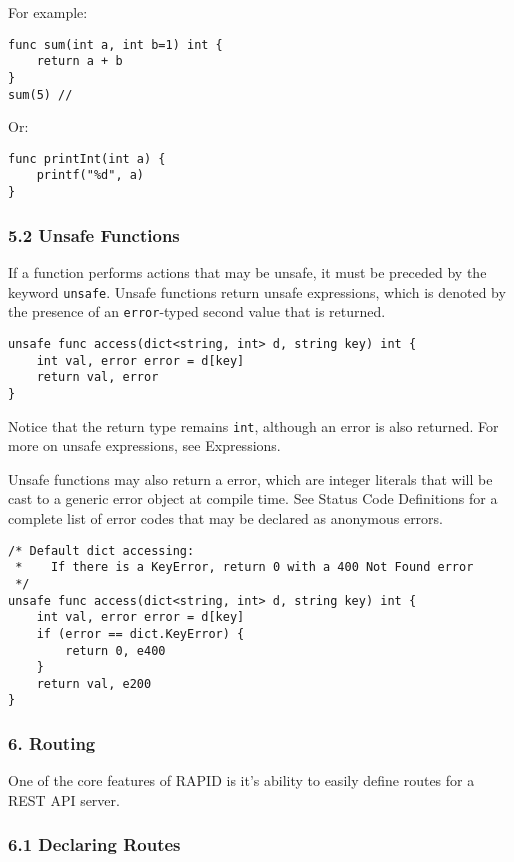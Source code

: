 For example:

\begin{verbatim}
func sum(int a, int b=1) int {
    return a + b
}
sum(5) //
\end{verbatim}

Or:

\begin{verbatim}
func printInt(int a) {
    printf("%d", a)
}
\end{verbatim}

\subsubsection*{5.2 Unsafe Functions}\label{unsafe-functions}

If a function performs actions that may be unsafe, it must be preceded
by the keyword \texttt{unsafe}. Unsafe functions return unsafe
expressions, which is denoted by the presence of an \texttt{error}-typed
second value that is returned.

\begin{verbatim}
unsafe func access(dict<string, int> d, string key) int {
    int val, error error = d[key]
    return val, error
}
\end{verbatim}

Notice that the return type remains \texttt{int}, although an error is
also returned. For more on unsafe expressions, see Expressions.

Unsafe functions may also return a error, which are integer literals
that will be cast to a generic error object at compile time. See Status
Code Definitions for a complete list of error codes that may be declared
as anonymous errors.

\begin{verbatim}
/* Default dict accessing:
 *    If there is a KeyError, return 0 with a 400 Not Found error
 */
unsafe func access(dict<string, int> d, string key) int {
    int val, error error = d[key]
    if (error == dict.KeyError) {
        return 0, e400
    }
    return val, e200
}
\end{verbatim}

\subsubsection*{6. Routing}\label{routing}

One of the core features of RAPID is it's ability to easily define
routes for a REST API server.

\subsubsection*{6.1 Declaring Routes}\label{declaring-routes}

